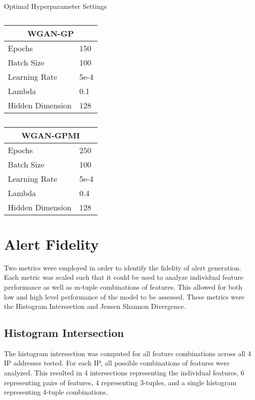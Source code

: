\begin{table}[!htb]
	\centering
	\caption{Optimal Hyperparameter Settings}
	\label{tab:params}
	\begin{subtable}{.5\linewidth}
		\centering
		\caption{}
		\begin{tabular}{l|l}
			\hline
			\multicolumn{2}{c}{\textbf{WGAN-GP}} \\
			\hline
			Epochs & 150 \\
			Batch Size & 100 \\
			Learning Rate & 5e-4 \\
			Lambda & 0.1 \\
			Hidden Dimension & 128
		\end{tabular}
	\end{subtable}%
	\begin{subtable}{.5\linewidth}
		\centering
		\caption{}
		\begin{tabular}{l|l}
			\hline
			\multicolumn{2}{c}{\textbf{ WGAN-GPMI}} \\
			\hline
			Epochs & 250 \\
			Batch Size & 100 \\
			Learning Rate & 5e-4 \\
			Lambda & 0.4 \\
			Hidden Dimension & 128
		\end{tabular}
	\end{subtable}%
\end{table}

\section{Alert Fidelity}
\label{sec:fidel}

Two metrics were employed in order to identify the fidelity of alert generation. Each metric was scaled such that it could be used to analyze individual feature performance as well as m-tuple combinations of features. This allowed for both low and high level performance of the model to be assessed. These metrics were the Histogram Intersection and Jensen Shannon Divergence.

\subsection{Histogram Intersection}
\label{sec:inter}

The histogram intersection was computed for all feature combinations across all 4 IP addresses tested. For each IP, all possible combinations of features were analyzed. This resulted in 4 intersections representing the individual features, 6 representing pairs of features, 4 representing 3-tuples, and a single histogram representing 4-tuple combinations.

